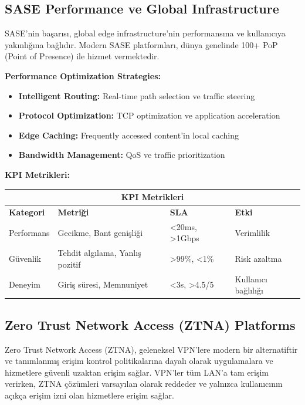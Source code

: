 \subsection{SASE Performance ve Global Infrastructure}

SASE'nin başarısı, global edge infrastructure'nin performansına ve kullanıcıya yakınlığına bağlıdır. Modern SASE platformları, dünya genelinde 100+ PoP (Point of Presence) ile hizmet vermektedir.

\textbf{Performance Optimization Strategies:}
\begin{itemize}
    \item \textbf{Intelligent Routing:} Real-time path selection ve traffic steering
    \item \textbf{Protocol Optimization:} TCP optimization ve application acceleration
    \item \textbf{Edge Caching:} Frequently accessed content'in local caching
    \item \textbf{Bandwidth Management:} QoS ve traffic prioritization
\end{itemize}

\textbf{KPI Metrikleri:}
\begin{adjustbox}{max width=\textwidth}
\small
\begin{tabularx}{\textwidth}{|p{2.5cm}|p{3cm}|p{2cm}|p{2cm}|}
\hline
\multicolumn{4}{|c|}{\textbf{KPI Metrikleri}} \\
\hline
\textbf{Kategori} & \textbf{Metriği} & \textbf{SLA} & \textbf{Etki} \\
\hline
Performans & Gecikme, Bant genişliği & <20ms, >1Gbps & Verimlilik \\
\hline
Güvenlik & Tehdit algılama, Yanlış pozitif & >99\%, <1\% & Risk azaltma \\
\hline
Deneyim & Giriş süresi, Memnuniyet & <3s, >4.5/5 & Kullanıcı bağlılığı \\
\hline
\end{tabularx}
\end{adjustbox}


\subsection{Zero Trust Network Access (ZTNA) Platforms}

Zero Trust Network Access (ZTNA), geleneksel VPN'lere modern bir alternatiftir ve tanımlanmış erişim kontrol politikalarına dayalı olarak uygulamalara ve hizmetlere güvenli uzaktan erişim sağlar. VPN'ler tüm LAN'a tam erişim verirken, ZTNA çözümleri varsayılan olarak reddeder ve yalnızca kullanıcının açıkça erişim izni olan hizmetlere erişim sağlar.

